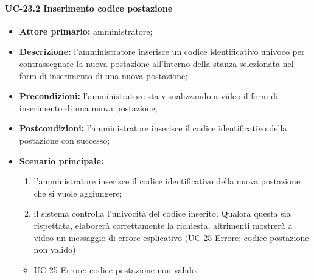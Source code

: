 \paragraph{UC-23.2 Inserimento codice postazione}
\begin{itemize}
	\item \textbf{Attore primario:} amministratore;
	\item \textbf{Descrizione:} l'amministratore inserisce un codice identificativo univoco per contrassegnare la nuova postazione all'interno della stanza selezionata nel form di inserimento di una nuova postazione;
	\item \textbf{Precondizioni:} l'amministratore sta visualizzando a video il form di inserimento di una nuova postazione;
	\item \textbf{Postcondizioni:} l'amministratore inserisce il codice identificativo della postazione con successo;
	\item \textbf{Scenario principale:}
	      \begin{enumerate}
		      \item l'amministratore inserisce il codice identificativo della nuova postazione che si vuole aggiungere;
		      \item il sistema controlla l'univocità del codice inserito. Qualora questa sia rispettata, elaborerà correttamente la richiesta, altrimenti mostrerà a video un messaggio di errore esplicativo (UC-25 Errore: codice postazione non valido)
	      \end{enumerate}
          \begin{itemize}
            \item UC-25 Errore: codice postazione non valido.
        \end{itemize}
\end{itemize}
    

